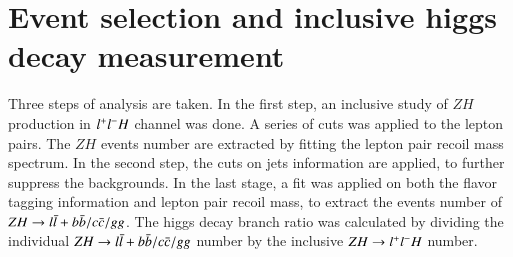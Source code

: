 \section{Event selection and inclusive higgs decay measurement}\label{sec:event_selection}
Three steps of analysis are taken. In the first step, an inclusive study of $ZH$ production in $l^{+}l^{-}H$ channel was done. A series of cuts was applied to the lepton pairs. The $ZH$ events number are extracted by fitting the lepton pair recoil mass spectrum. In the second step, the cuts on jets information are applied, to further suppress the backgrounds. In the last stage, a fit was applied on both the flavor tagging information and lepton pair recoil mass, 
to extract the events number of $ZH\rightarrow l\bar{l}+b\bar{b}/c\bar{c}/gg$. 
The higgs decay branch ratio was calculated by dividing the individual $ZH\rightarrow l\bar{l}+b\bar{b}/c\bar{c}/gg$  number by the inclusive $ZH\rightarrow l^{+}l^{-}H$ number.



%
%
